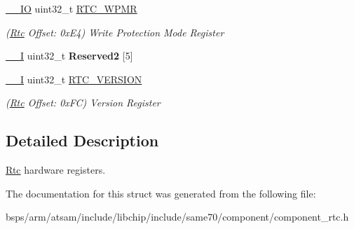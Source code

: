 \begin{DoxyCompactItemize}
\item 
\mbox{\label{structRtc_a487efe9708969b2951d47b5a4bfb35c3}} 
\mbox{\hyperlink{core__cm7_8h_aec43007d9998a0a0e01faede4133d6be}{\+\_\+\+\_\+\+IO}} uint32\+\_\+t \mbox{\hyperlink{structRtc_a487efe9708969b2951d47b5a4bfb35c3}{R\+T\+C\+\_\+\+W\+P\+MR}}
\begin{DoxyCompactList}\small\item\em (\mbox{\hyperlink{structRtc}{Rtc}} Offset\+: 0x\+E4) Write Protection Mode Register \end{DoxyCompactList}\item 
\mbox{\label{structRtc_ab5281752e1c6d50e079993e48fcf6f2c}} 
\mbox{\hyperlink{core__cm7_8h_af63697ed9952cc71e1225efe205f6cd3}{\+\_\+\+\_\+I}} uint32\+\_\+t {\bfseries Reserved2} \mbox{[}5\mbox{]}
\item 
\mbox{\label{structRtc_a333a48fc99e0437c294ffaffde67b099}} 
\mbox{\hyperlink{core__cm7_8h_af63697ed9952cc71e1225efe205f6cd3}{\+\_\+\+\_\+I}} uint32\+\_\+t \mbox{\hyperlink{structRtc_a333a48fc99e0437c294ffaffde67b099}{R\+T\+C\+\_\+\+V\+E\+R\+S\+I\+ON}}
\begin{DoxyCompactList}\small\item\em (\mbox{\hyperlink{structRtc}{Rtc}} Offset\+: 0x\+FC) Version Register \end{DoxyCompactList}\end{DoxyCompactItemize}


\subsection{Detailed Description}
\mbox{\hyperlink{structRtc}{Rtc}} hardware registers. 

The documentation for this struct was generated from the following file\+:\begin{DoxyCompactItemize}
\item 
bsps/arm/atsam/include/libchip/include/same70/component/component\+\_\+rtc.\+h\end{DoxyCompactItemize}
